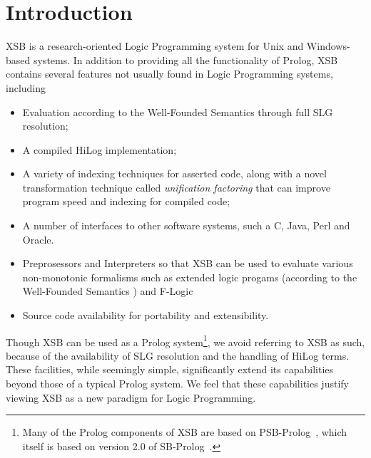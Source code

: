 \chapter{Introduction} \label{introduction}

XSB is a research-oriented Logic Programming system for Unix and
Windows-based systems.  In addition to providing all the
functionality of Prolog, XSB contains several features not usually
found in Logic Programming systems, including
\begin{itemize}
\item Evaluation according to the Well-Founded Semantics \cite{VGRS91}
	through full SLG resolution; 
\item A compiled HiLog implementation;
\item A variety of indexing techniques for asserted code, along
      with a novel transformation technique called {\em unification
      factoring} that can improve program speed and indexing for
      compiled code;
\item A number of interfaces to other software systems, such a C,
	Java, Perl and Oracle. 
\item Preprosessors and Interpreters so that XSB can be used to
evaluate various non-monotonic formalisms such as extended logic
progams (according to the Well-Founded Semantics \cite{ADP94}) and
F-Logic \cite{KLW95} 
\item Source code availability for portability and extensibility.
\end{itemize}
 
Though XSB can be used as a Prolog system\footnote{Many of the Prolog
components of XSB are based on PSB-Prolog~\cite{Xu90}, which itself is
based on version 2.0 of SB-Prolog~\cite{Debr88}.}, we avoid referring
to XSB as such, because of the availability of SLG resolution and the
handling of HiLog terms.  These facilities, while seemingly simple,
significantly extend its capabilities beyond those of a typical Prolog
system. We feel that these capabilities justify viewing XSB as a new
paradigm for Logic Programming.

